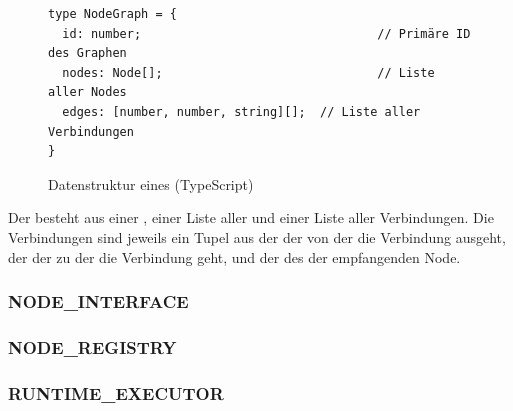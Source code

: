 \documentclass[ngerman]{article}
\begin{document}
\begin{figure}[htbp]
  \begin{code}
    \begin{verbatim}
type NodeGraph = {
  id: number;                                 // Primäre ID des Graphen
  nodes: Node[];                              // Liste aller Nodes
  edges: [number, number, string][];  // Liste aller Verbindungen
}
    \end{verbatim}
  \end{code}

  \caption{Datenstruktur eines  (TypeScript)}
  \label{fig:data_node_graph}

\end{figure}

Der  besteht aus einer , einer Liste aller  und einer Liste aller Verbindungen. 
Die Verbindungen sind jeweils ein Tupel aus der  der  von der die Verbindung ausgeht, der  der  zu der die Verbindung geht, und der  des  der empfangenden Node.

\pagebreak

\subsubsection{NODE\_INTERFACE}
\label{sec:node_interface}
\subsubsection{NODE\_REGISTRY}
\label{sec:node_registry}
\subsubsection{RUNTIME\_EXECUTOR}
\label{sec:runtime_executor}
\end{document}
